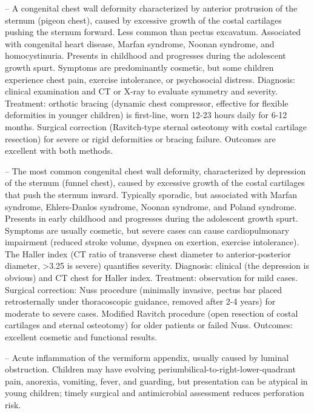 -- A congenital chest wall deformity characterized by anterior protrusion of the sternum (pigeon chest), caused by excessive growth of the costal cartilages pushing the sternum forward. Less common than pectus excavatum. Associated with congenital heart disease, Marfan syndrome, Noonan syndrome, and homocystinuria. Presents in childhood and progresses during the adolescent growth spurt. Symptoms are predominantly cosmetic, but some children experience chest pain, exercise intolerance, or psychosocial distress. Diagnosis: clinical examination and CT or X-ray to evaluate symmetry and severity. Treatment: orthotic bracing (dynamic chest compressor, effective for flexible deformities in younger children) is first-line, worn 12-23 hours daily for 6-12 months. Surgical correction (Ravitch-type sternal osteotomy with costal cartilage resection) for severe or rigid deformities or bracing failure. Outcomes are excellent with both methods.

-- The most common congenital chest wall deformity, characterized by depression of the sternum (funnel chest), caused by excessive growth of the costal cartilages that push the sternum inward. Typically sporadic, but associated with Marfan syndrome, Ehlers-Danlos syndrome, Noonan syndrome, and Poland syndrome. Presents in early childhood and progresses during the adolescent growth spurt. Symptoms are usually cosmetic, but severe cases can cause cardiopulmonary impairment (reduced stroke volume, dyspnea on exertion, exercise intolerance). The Haller index (CT ratio of transverse chest diameter to anterior-posterior diameter, >3.25 is severe) quantifies severity. Diagnosis: clinical (the depression is obvious) and CT chest for Haller index. Treatment: observation for mild cases. Surgical correction: Nuss procedure (minimally invasive, pectus bar placed retrosternally under thoracoscopic guidance, removed after 2-4 years) for moderate to severe cases. Modified Ravitch procedure (open resection of costal cartilages and sternal osteotomy) for older patients or failed Nuss. Outcomes: excellent cosmetic and functional results.

-- Acute inflammation of the vermiform appendix, usually caused by luminal obstruction. Children may have evolving periumbilical-to-right-lower-quadrant pain, anorexia, vomiting, fever, and guarding, but presentation can be atypical in young children; timely surgical and antimicrobial assessment reduces perforation risk.

